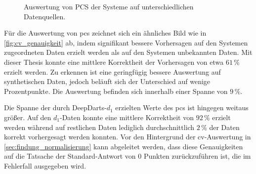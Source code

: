 \begin{figure}
    \centering
    \caption{Auswertung von PCS der Systeme auf unterschiedlichen Datenquellen.}
    \label{fig:nn_pcs}
\end{figure}

Für die Auswertung von \ac{pcs} zeichnet sich ein ähnliches Bild wie in \autoref{fig:cv_genauigkeit} ab, indem signifikant bessere Vorhersagen auf den Systemen zugeordneten Daten erzielt werden als auf den Systemen unbekannten Daten. Mit dieser Thesis konnte eine mittlere Korrektheit der Vorhersagen von etwa $61\,\%$ erzielt werden. Zu erkennen ist eine geringfügig bessere Auswertung auf synthetischen Daten, jedoch beläuft sich der Unterschied auf wenige Prozentpunkte. Die Auswertung befinden sich innerhalb einer Spanne von $9\,\%$.

Die Spanne der durch DeepDarts-$d_1$ erzielten Werte des \ac{pcs} ist hingegen weitaus größer. Auf den $d_1$-Daten konnte eine mittlere Korrektheit von $92\,\%$ erzielt werden während auf restlichen Daten lediglich durchschnittlich $2\,\%$ der Daten korrekt vorhergesagt werden konnten. Vor den Hintergrund der \ac{cv}-Auswertung in \autoref{sec:findung_normalisierung} kann abgeleitet werden, dass diese Genauigkeiten auf die Tatsache der Standard-Antwort von 0 Punkten zurückzuführen ist, die im Fehlerfall ausgegeben wird.

